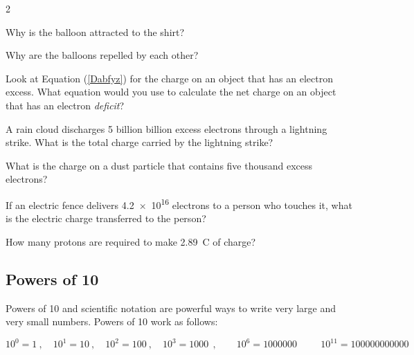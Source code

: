 \documentclass[dvipsnames]{article}
\numberwithin{equation}{section}
\numberwithin{figure}{section}
\begin{document}
\begin{multicols}{2}
\begin{exercise}
    Why is the balloon attracted to the shirt?
\end{exercise}

\begin{exercise} \label{VKqxLG}
    Why are the balloons repelled by each other?
\end{exercise}

\cyanhrule

\begin{exercise} \label{9U7zJj}
    Look at Equation (\ref{Dabfyz}) for the charge on an object that has an electron excess. What equation would you use to calculate the net charge on an object that has an electron \textit{deficit}?
\end{exercise}

\begin{exercise} \label{gEsEJ7}
    A rain cloud discharges 5 billion billion excess electrons through a lightning strike. What is the total charge carried by the lightning strike?
\end{exercise}



\begin{exercise} \label{d3zygU}
    What is the charge on a dust particle that contains five thousand excess electrons?
\end{exercise}

\begin{exercise} \label{ERkfIH}
    If an electric fence delivers \SI{4.2e16}{} electrons to a person who touches it, what is the electric charge transferred to the person?
\end{exercise}

\begin{exercise} \label{9qwZGy}
    How many protons are required to make \SI{2.89}{C} of charge?
\end{exercise}

\end{multicols}

\cyanhrule

\subsection{Powers of 10} \label{tdVujC}

Powers of 10 and scientific notation are powerful ways to write very large and very small numbers. Powers of 10 work as follows:

\begin{equation*}
    10^0 = 1\ , \quad 10^1 = 10\ , \quad 10^2 = 100\ , \quad 10^3 = \SI{1000}{}\ , \qquad 10^6 = \SI{1000000}{}\ \qquad 10^{11} = \SI{100000000000}{}
\end{equation*}
\end{document}
